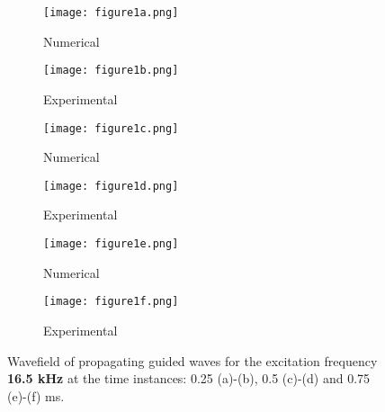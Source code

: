 \documentclass[runningheads]{llncs}
\begin{document}
\begin{figure} [h!]
	\centering
	\begin{subfigure}[b]{0.49\textwidth}
		\centering
		\texttt{[image: figure1a.png]}
		\caption{Numerical}
		\label{fig:wavefield16_5a}
	\end{subfigure}
	\begin{subfigure}[b]{0.49\textwidth}
		\centering
		\texttt{[image: figure1b.png]}
		\caption{Experimental}
		\label{fig:wavefield16_5b}
	\end{subfigure}
	\begin{subfigure}[b]{0.49\textwidth}
		\centering
		\texttt{[image: figure1c.png]}
		\caption{Numerical}
		\label{fig:wavefield16_5c}
	\end{subfigure}
	\begin{subfigure}[b]{0.49\textwidth}
		\centering
		\texttt{[image: figure1d.png]}
		\caption{Experimental}
		\label{fig:wavefield16_5d}
	\end{subfigure}
	\begin{subfigure}[b]{0.49\textwidth}
		\centering
		\texttt{[image: figure1e.png]}
		\caption{Numerical}
		\label{fig:wavefield16_5e}
	\end{subfigure}
	\begin{subfigure}[b]{0.49\textwidth}
		\centering
		\texttt{[image: figure1f.png]}
		\caption{Experimental}
		\label{fig:wavefield16_5f}
	\end{subfigure}
	\caption{Wavefield of propagating guided waves for the excitation frequency \textbf{16.5 kHz} at the time instances:  0.25 (a)-(b), 0.5 (c)-(d) and 0.75 (e)-(f) ms. }
	\label{fig:wavefield16_5}
\end{figure}
\end{document}
